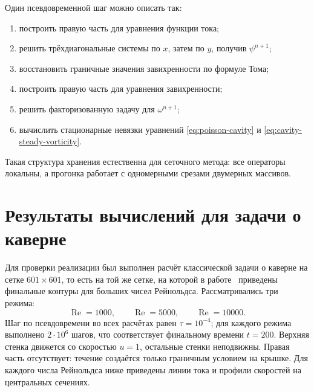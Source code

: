 \documentclass[12pt,a4paper]{article}
\newcommand{\Reynolds}{\operatorname{Re}}
\begin{document}
Один псевдовременной шаг можно описать так:
\begin{enumerate}
    \item построить правую часть для уравнения функции тока;
    \item решить трёхдиагональные системы по \(x\), затем по \(y\), получив \(\psi^{n+1}\);
    \item восстановить граничные значения завихренности по формуле Тома;
    \item построить правую часть для уравнения завихренности;
    \item решить факторизованную задачу для \(\omega^{n+1}\);
    \item вычислить стационарные невязки уравнений \eqref{eq:poisson-cavity} и \eqref{eq:cavity-steady-vorticity}.
\end{enumerate}
Такая структура хранения естественна для сеточного метода: все операторы локальны, а прогонка работает с одномерными срезами двумерных массивов.

\section{Результаты вычислений для задачи о каверне}

Для проверки реализации был выполнен расчёт классической задачи о каверне на сетке \(601\times601\), то есть на той же сетке, на которой в работе~\cite{erturk2005} приведены финальные контуры для больших чисел Рейнольдса.
Рассматривались три режима:
\[
    \Reynolds=1000,\qquad
    \Reynolds=5000,\qquad
    \Reynolds=10000.
\]
Шаг по псевдовремени во всех расчётах равен \(\tau=10^{-4}\); для каждого режима выполнено \(2\cdot10^6\) шагов, что соответствует финальному времени \(t=200\).
Верхняя стенка движется со скоростью \(u=1\), остальные стенки неподвижны.
Правая часть отсутствует: течение создаётся только граничным условием на крышке.
Для каждого числа Рейнольдса ниже приведены линии тока и профили скоростей на центральных сечениях.
\end{document}
